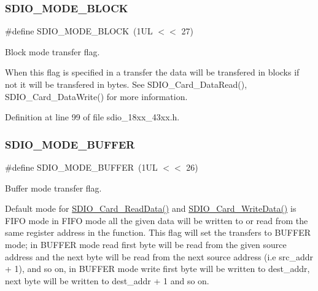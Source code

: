 \subsubsection{\texorpdfstring{S\+D\+I\+O\+\_\+\+M\+O\+D\+E\+\_\+\+B\+L\+O\+CK}{SDIO\_MODE\_BLOCK}}
{\footnotesize\ttfamily \#define S\+D\+I\+O\+\_\+\+M\+O\+D\+E\+\_\+\+B\+L\+O\+CK~(1\+U\+L $<$$<$ 27)}



Block mode transfer flag. 

When this flag is specified in a transfer the data will be transfered in blocks if not it will be transfered in bytes. See S\+D\+I\+O\+\_\+\+Card\+\_\+\+Data\+Read(), S\+D\+I\+O\+\_\+\+Card\+\_\+\+Data\+Write() for more information. 

Definition at line 99 of file sdio\+\_\+18xx\+\_\+43xx.\+h.

\mbox{\label{group___s_d_i_o__18_x_x__43_x_x_gacfb2f991cf5339b325520be169aa90d8}} 
\subsubsection{\texorpdfstring{S\+D\+I\+O\+\_\+\+M\+O\+D\+E\+\_\+\+B\+U\+F\+F\+ER}{SDIO\_MODE\_BUFFER}}
{\footnotesize\ttfamily \#define S\+D\+I\+O\+\_\+\+M\+O\+D\+E\+\_\+\+B\+U\+F\+F\+ER~(1\+U\+L $<$$<$ 26)}



Buffer mode transfer flag. 

Default mode for \hyperlink{group___s_d_i_o__18_x_x__43_x_x_ga340277ee179263511434895dd79fdd81}{S\+D\+I\+O\+\_\+\+Card\+\_\+\+Read\+Data()} and \hyperlink{group___s_d_i_o__18_x_x__43_x_x_gab2b52e00bab2f72ab27fca006c48cf19}{S\+D\+I\+O\+\_\+\+Card\+\_\+\+Write\+Data()} is F\+I\+FO mode in F\+I\+FO mode all the given data will be written to or read from the same register address in the function. This flag will set the transfers to B\+U\+F\+F\+ER mode; in B\+U\+F\+F\+ER mode read first byte will be read from the given source address and the next byte will be read from the next source address (i.\+e src\+\_\+addr + 1), and so on, in B\+U\+F\+F\+ER mode write first byte will be written to dest\+\_\+addr, next byte will be written to dest\+\_\+addr + 1 and so on. 

